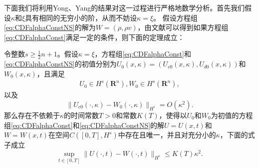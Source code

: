 	下面我们将利用Yong、Yang的结果\cite{yang2015validity}对这一过程进行严格地数学分析。首先我们假设$\kappa$和$\xi$具有相同的无穷小的阶，从而不妨设$\kappa = \xi$。
	假设方程组\eqref{eq:CDFalphaConstNS}的解为$W = (\rho,\rho v)$，由文献\cite{yang2015validity}可以得到如果方程组\eqref{eq:CDFalphaConst}满足一定的条件，则下面的定理成立：
	\begin{theorem} \label{th:chapmanenskog}
		令整数$s \ge \frac{1}{2}n+1$。假设$\kappa=\xi$，方程组\eqref{eq:CDFalphaConst}和\eqref{eq:CDFalphaConstNS}的初值分别为$U_0(x,\kappa) = (U_{c0}(x,\kappa),U_{d0}(x,\kappa))$和$W_0(x,\kappa)$，且满足
		\begin{eqnarray*}
			U_0 \in H^s(\mathbf{R}^n), W_0 \in H^s(\mathbf{R}^n),
		\end{eqnarray*}
		以及
		\begin{equation*}
			\|U_{c0}(\cdot,\kappa) - W_0(\cdot, \kappa) \|_{H^s} = O(\kappa^2).
		\end{equation*}
		那么存在不依赖于$\kappa$的时间常数$T>0$和常数$K(T)$，使得以$U_0$和$W_0$为初值的方程组\eqref{eq:CDFalphaConst}和\eqref{eq:CDFalphaConstNS}的解$U=U(x,t)$和$W=W(x,t)$在空间$C([0,T],H^s)$中存在且唯一，并且对充分小的$\kappa$，下面的式子成立
		\begin{equation}
			\sup_{t \in [0,T]} \| U(\cdot,t) - W(\cdot,t) \|_{H^s} \le K(T) \kappa^2.
		\end{equation}
	\end{theorem}

